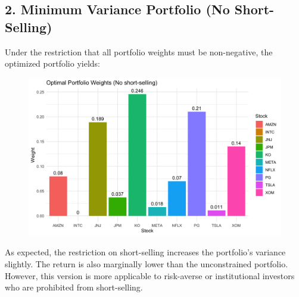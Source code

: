 \documentclass[11pt]{article}
\begin{document}
\subsection*{2.  Minimum Variance Portfolio (No Short-Selling)}
Under the restriction that all portfolio weights must be non-negative, the optimized portfolio yields:
\begin{figure}[H]
    \centering
    \begin{minipage}{0.48\textwidth}
        \includegraphics[width=\linewidth]{Findings_Yutong/portfolio_weights_plot.png}
    \end{minipage}%
    \hfill
    \begin{minipage}{0.48\textwidth}
        \label{opt-weights-no}
    \end{minipage}
\end{figure}
As expected, the restriction on short-selling increases the portfolio's variance slightly. The return is also marginally lower than the unconstrained portfolio. However, this version is more applicable to risk-averse or institutional investors who are prohibited from short-selling.
\end{document}
